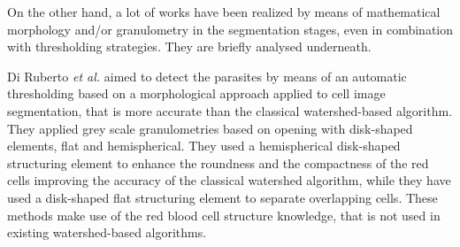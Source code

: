 \documentclass[sensors,review,submit,moreauthors,pdftex,10pt,a4paper]{mdpi}
\begin{document}
On the other hand, a lot of works have been realized by means of mathematical morphology and/or granulometry in the segmentation stages, even in combination with thresholding strategies. They are briefly analysed underneath.


Di Ruberto \emph{et al.} \cite{DiRuberto2002} aimed to detect the parasites by means of an automatic thresholding based on a morphological approach applied to cell image segmentation, that is more accurate than the classical watershed-based algorithm. They applied grey scale granulometries based on opening with disk-shaped elements, flat and hemispherical. They used a hemispherical disk-shaped structuring element to enhance the roundness and the compactness of the red cells improving the accuracy of the classical watershed algorithm, while they have used a disk-shaped flat structuring element to separate overlapping cells. These methods make use of the red blood cell structure knowledge, that is not used in existing watershed-based algorithms.
\end{document}

